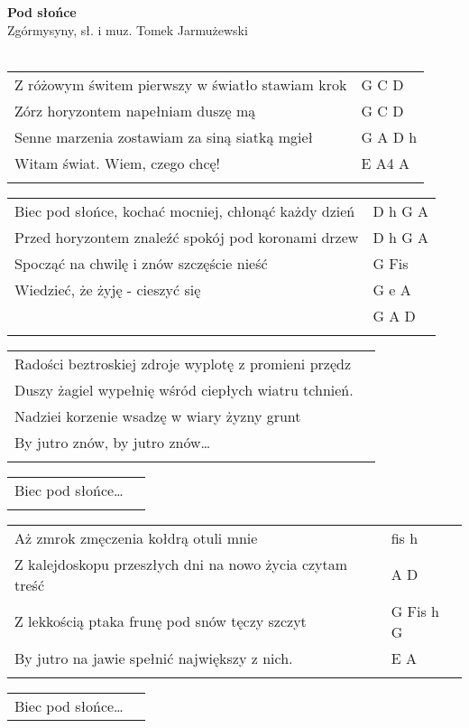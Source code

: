 \documentclass[a5paper]{article}
\begin{document}


\noindent
\fontsize{12pt}{15pt}\selectfont
\textbf{Pod słońce} \\
\fontsize{8pt}{10pt}\selectfont
Zgórmysyny, sł. i muz. Tomek Jarmużewski \\ \\
\fontsize{10pt}{12pt}\selectfont
{}
\begin{tabular}{@{}p{9.20cm}p{3cm}@{}}
\noindent
Z różowym świtem pierwszy w światło stawiam krok & G C D \\
Zórz horyzontem napełniam duszę mą & G C D \\
Senne marzenia zostawiam za siną siatką mgieł & G A D h \\
Witam świat. Wiem, czego chcę! & E A4 A \\ \\
\end{tabular}

\noindent
\begin{tabular}{@{}p{8.20cm}p{3cm}@{}}
Biec pod słońce, kochać mocniej, chłonąć każdy dzień & D h G A \\
Przed horyzontem znaleźć spokój pod koronami drzew & D h G A \\
Spocząć na chwilę i znów szczęście nieść & G Fis \\
Wiedzieć, że żyję - cieszyć się & G e A \\
								& G A D \\ \\
\end{tabular}

\noindent
\begin{tabular}{@{}p{8.20cm}p{3cm}@{}}
Radości beztroskiej zdroje wyplotę z promieni przędz \\
Duszy żagiel wypełnię wśród ciepłych wiatru tchnień. \\
Nadziei korzenie wsadzę w wiary żyzny grunt \\
By jutro znów, by jutro znów… \\ \\
\end{tabular}

\noindent
\begin{tabular}{@{}p{8.20cm}p{3cm}@{}}
Biec pod słońce… \\ \\
\end{tabular}

\noindent
\begin{tabular}{@{}p{9.20cm}p{3cm}@{}}
Aż zmrok zmęczenia kołdrą otuli mnie & fis h \\
Z kalejdoskopu przeszłych dni na nowo życia czytam treść & A D \\
Z lekkością ptaka frunę pod snów tęczy szczyt & G Fis h G \\
By jutro na jawie spełnić największy z nich. & E A \\ \\
\end{tabular}

\noindent
\begin{tabular}{@{}p{8.20cm}p{3cm}@{}}
Biec pod słońce…
\end{tabular}
\end{document}
